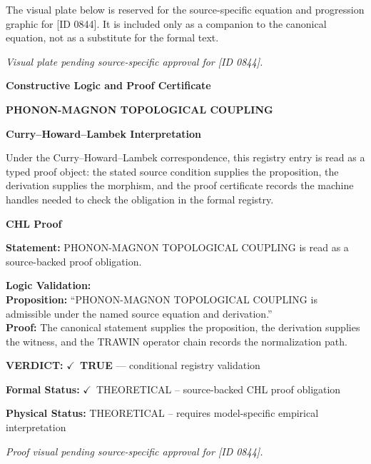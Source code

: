 \begingroup\footnotesize\sloppy
The visual plate below is reserved for the source-specific equation and progression graphic for [ID 0844]. It is included only as a companion to the canonical equation, not as a substitute for the formal text.
\par\endgroup
\begingroup\footnotesize\itshape
Visual plate pending source-specific approval for [ID 0844].
\par\endgroup

\clearpage
\begingroup\tzpsupportsetup
\noindent\textbf{\fontsize{10.8pt}{12.8pt}\selectfont [ID 0844] Constructive Logic and Proof Certificate}\par
\noindent\textbf{\fontsize{10pt}{12pt}\selectfont PHONON-MAGNON TOPOLOGICAL COUPLING}\par
\vspace{0.45em}
\begingroup
\footnotesize
\setlength{\parskip}{0.22em}
\setlength{\parindent}{0pt}
\noindent\textbf{Curry--Howard--Lambek Interpretation}\par
Under the Curry--Howard--Lambek correspondence, this registry entry is read as a typed proof
object: the stated source condition supplies the proposition, the derivation supplies the
morphism, and the proof certificate records the machine handles needed to check the obligation
in the formal registry.

\vspace{0.45em}
\noindent\textbf{CHL Proof}\par
\textbf{Statement:} PHONON-MAGNON TOPOLOGICAL COUPLING is read as a source-backed proof obligation.

\textbf{Logic Validation:}\\
\textbf{Proposition:} ``PHONON-MAGNON TOPOLOGICAL COUPLING is admissible under the named source equation and derivation.''\\
\textbf{Proof:} The canonical statement supplies the proposition, the derivation supplies the witness, and the TRAWIN operator chain records the normalization path.

\textbf{VERDICT:} \ensuremath{\checkmark}\ \textbf{TRUE} --- conditional registry validation

\textbf{Formal Status:} \ensuremath{\checkmark}\ THEORETICAL -- source-backed CHL proof obligation

\textbf{Physical Status:} THEORETICAL -- requires model-specific empirical interpretation
\par\vspace{0.45em}
\par
\vfill
\begingroup\footnotesize\itshape
Proof visual pending source-specific approval for [ID 0844].
\par\endgroup
\vfill
\endgroup
\endgroup
